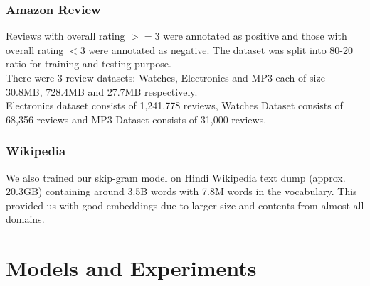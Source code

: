 \documentclass[11pt,a4paper]{article}
\begin{document}
\subsubsection{Amazon Review}
\label{data:amazon}
Reviews with overall rating $>=$3 were annotated as positive and those with overall rating $<$3 were annotated as negative. The dataset was split into 80-20 ratio for training and testing purpose.\\
There were 3 review datasets: Watches, Electronics and MP3 each of size 30.8MB, 728.4MB and 27.7MB respectively.\\
Electronics dataset consists of 1,241,778 reviews, Watches Dataset consists of 68,356 reviews and MP3 Dataset consists of 31,000 reviews.

\subsubsection{Wikipedia}
We also trained our skip-gram model on Hindi Wikipedia text dump (approx. 20.3GB) containing around 3.5B words with 7.8M words in the vocabulary. This provided us with good embeddings due to larger size and contents from almost all domains.


\section{Models and Experiments}
\label{sec:experiment}
\end{document}
